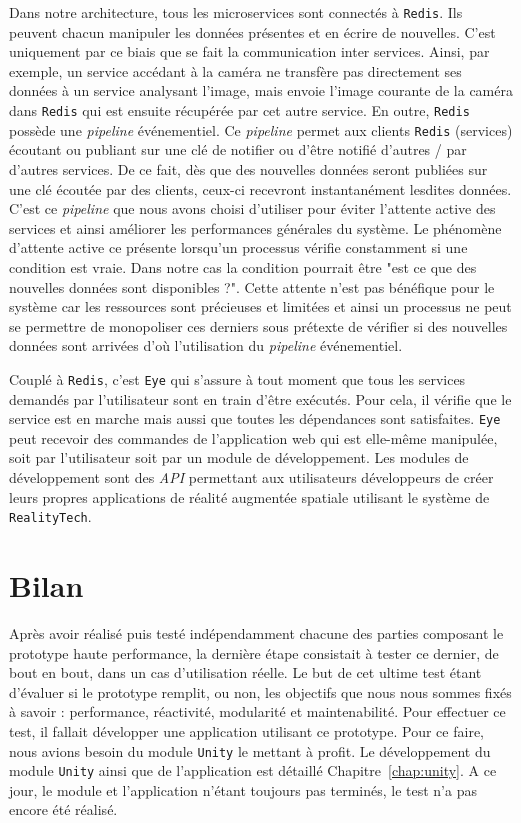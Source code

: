 Dans notre architecture, tous les microservices sont connectés à \texttt{Redis}. Ils peuvent chacun manipuler les données présentes et en écrire de nouvelles. C'est uniquement par ce biais que se fait la communication inter services. Ainsi, par exemple, un service accédant à la caméra ne transfère pas directement ses données à un service analysant l'image, mais envoie l'image courante de la caméra dans \texttt{Redis} qui est ensuite récupérée par cet autre service. En outre, \texttt{Redis} possède une \emph{pipeline} événementiel. Ce \emph{pipeline} permet aux clients \texttt{Redis} (services) écoutant ou publiant sur une clé de notifier ou d'être notifié d'autres / par d'autres services. De ce fait, dès que des nouvelles données seront publiées sur une clé écoutée par des clients, ceux-ci recevront instantanément lesdites données. C'est ce \emph{pipeline} que nous avons choisi d'utiliser pour éviter l'attente active des services et ainsi améliorer les performances générales du système.
Le phénomène d'attente active ce présente lorsqu'un processus vérifie constamment si une condition est vraie. Dans notre cas la condition pourrait être "est ce que des nouvelles données sont disponibles ?". Cette attente n'est pas bénéfique pour le système car les ressources sont précieuses et limitées et ainsi un processus ne peut se permettre de monopoliser ces derniers sous prétexte de vérifier si des nouvelles données sont arrivées d'où l'utilisation du \emph{pipeline} événementiel.

Couplé à \texttt{Redis}, c'est \texttt{Eye} qui s'assure à tout moment que tous les services demandés par l'utilisateur sont en train d'être exécutés. Pour cela, il vérifie que le service est en marche mais aussi que toutes les dépendances sont satisfaites. \texttt{Eye} peut recevoir des commandes de l'application web qui est elle-même manipulée, soit par l'utilisateur soit par un module de développement. Les modules de développement sont des \emph{API} permettant aux utilisateurs développeurs de créer leurs propres applications de réalité augmentée spatiale utilisant le système de \texttt{RealityTech}.

\section{Bilan}
Après avoir réalisé puis testé indépendamment chacune des parties composant le prototype haute performance, la dernière étape consistait à tester ce dernier, de bout en bout, dans un cas d'utilisation réelle. Le but de cet ultime test étant d'évaluer si le prototype remplit, ou non, les objectifs que nous nous sommes fixés à savoir : performance, réactivité, modularité et maintenabilité. 
Pour effectuer ce test, il fallait développer une application utilisant ce prototype. Pour ce faire, nous avions besoin du module \texttt{Unity} le mettant à profit. Le développement du module \texttt{Unity} ainsi que de l'application est détaillé Chapitre~\ref{chap:unity}.
A ce jour, le module et l'application n'étant toujours pas terminés, le test n'a pas encore été réalisé.